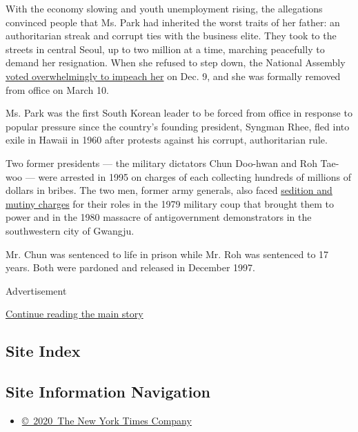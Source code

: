 With the economy slowing and youth unemployment rising, the allegations
convinced people that Ms. Park had inherited the worst traits of her
father: an authoritarian streak and corrupt ties with the business
elite. They took to the streets in central Seoul, up to two million at a
time, marching peacefully to demand her resignation. When she refused to
step down, the National Assembly
\href{https://www.nytimes.com/2016/12/09/world/asia/south-korea-president-park-geun-hye-impeached.html}{voted
overwhelmingly to impeach her} on Dec. 9, and she was formally removed
from office on March 10.

Ms. Park was the first South Korean leader to be forced from office in
response to popular pressure since the country's founding president,
Syngman Rhee, fled into exile in Hawaii in 1960 after protests against
his corrupt, authoritarian rule.

Two former presidents --- the military dictators Chun Doo-hwan and Roh
Tae-woo --- were arrested in 1995 on charges of each collecting hundreds
of millions of dollars in bribes. The two men, former army generals,
also faced
\href{http://www.nytimes.com/1995/12/22/world/south-korea-indicts-2-former-presidents-in-staging-of-1979-coup.html}{sedition
and mutiny charges} for their roles in the 1979 military coup that
brought them to power and in the 1980 massacre of antigovernment
demonstrators in the southwestern city of Gwangju.

Mr. Chun was sentenced to life in prison while Mr. Roh was sentenced to
17 years. Both were pardoned and released in December 1997.

Advertisement

\protect\hyperlink{after-bottom}{Continue reading the main story}

\hypertarget{site-index}{%
\subsection{Site Index}\label{site-index}}

\hypertarget{site-information-navigation}{%
\subsection{Site Information
Navigation}\label{site-information-navigation}}

\begin{itemize}
\tightlist
\item
  \href{https://help.nytimes.com/hc/en-us/articles/115014792127-Copyright-notice}{©~2020~The
  New York Times Company}
\end{itemize}

